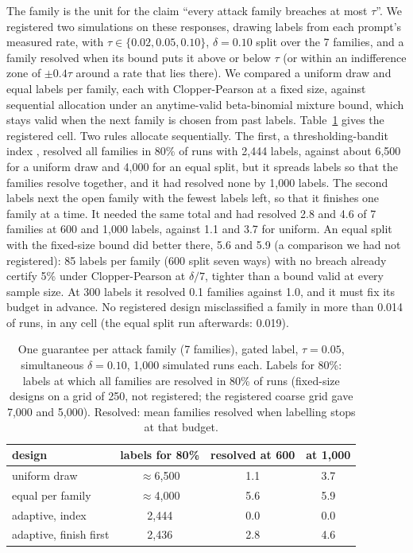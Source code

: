\documentclass[letterpaper]{article} %
\begin{document}
The family is the unit for the claim ``every attack family breaches at most $\tau$''. We registered two simulations
on these responses, drawing labels from each prompt's measured rate, with $\tau\in\{0.02,0.05,0.10\}$, $\delta=0.10$
split over the 7 families, and a family resolved when its bound puts it above or below $\tau$ (or within an
indifference zone of $\pm0.4\tau$ around a rate that lies there). We compared a uniform draw and equal labels per family,
each with Clopper-Pearson at a fixed size, against sequential allocation under an anytime-valid beta-binomial
mixture bound, which stays valid when the next family is chosen from past labels. Table~\ref{tab:family} gives the
registered cell. Two rules allocate sequentially. The first, a thresholding-bandit index \citep{locatelli2016apt},
resolved all families in 80\% of runs with 2,444 labels, against about 6,500 for a uniform draw and 4,000 for an equal
split, but it spreads labels so that the families resolve together, and it had resolved none by 1,000 labels. The
second labels next the open family with the fewest labels left, so that it finishes one family at a time. It needed
the same total and had resolved 2.8 and 4.6 of 7 families at 600 and 1,000 labels, against 1.1 and 3.7 for uniform.
An equal split with the fixed-size bound did better there, 5.6 and 5.9 (a comparison we had not registered): 85
labels per family (600 split seven ways) with no breach already certify 5\% under Clopper-Pearson at $\delta/7$, tighter than a bound valid at every sample size. At 300 labels it resolved 0.1 families against 1.0, and it must fix its budget in advance. No registered design misclassified a family in more than
0.014 of runs, in any cell (the equal split run afterwards: 0.019).

\begin{table}[t]
\centering
\small
\setlength{\tabcolsep}{4pt}
\begin{tabular}{@{}lccc@{}}
\toprule
design & labels for 80\% & resolved at 600 & at 1,000 \\
\midrule
uniform draw & $\approx$6,500 & 1.1 & 3.7 \\
equal per family & $\approx$4,000 & 5.6 & 5.9 \\
adaptive, index & 2,444 & 0.0 & 0.0 \\
adaptive, finish first & 2,436 & 2.8 & 4.6 \\
\bottomrule
\end{tabular}
\caption{One guarantee per attack family (7 families), gated label, $\tau=0.05$, simultaneous $\delta=0.10$, 1,000
simulated runs each. Labels for 80\%: labels at which all families are resolved in 80\% of runs (fixed-size designs on
a grid of 250, not registered; the registered coarse grid gave 7,000 and 5,000). Resolved: mean families
resolved when labelling stops at that budget.}
\label{tab:family}
\end{table}
\end{document}
